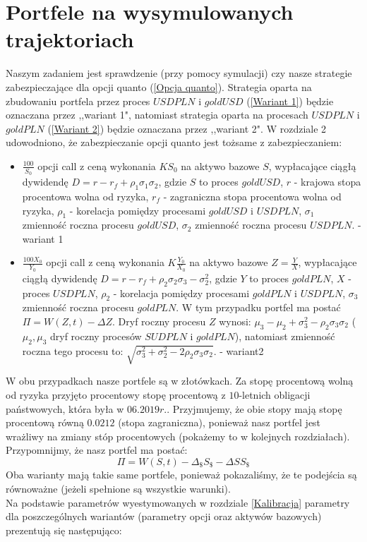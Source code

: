 \documentclass[12pt]{article}
\begin{document}
\newpage

\section{Portfele na wysymulowanych trajektoriach}
Naszym zadaniem jest sprawdzenie (przy pomocy symulacji) czy nasze strategie zabezpieczające dla
opcji quanto (\ref{Opcja quanto}). Strategia oparta na zbudowaniu portfela przez proces $USDPLN$ i $goldUSD$ (\ref{Wariant 1}) będzie oznaczana przez ,,wariant 1", natomiast strategia oparta na procesach $USDPLN$ i $goldPLN$ (\ref{Wariant 2}) będzie oznaczana przez ,,wariant 2". W rozdziale 2 udowodniono, że zabezpieczanie opcji quanto jest tożsame z zabezpieczaniem:
\begin{itemize}
    \item $\frac{100}{S_0}$ opcji call z ceną wykonania $KS_0$ na aktywo bazowe $S$, wypłacające ciągłą dywidendę $D=r-r_f+\rho_1 \sigma_1 \sigma_2$, gdzie $S$ to proces $goldUSD$, $r$ - krajowa stopa procentowa wolna od ryzyka, $r_f$ - zagraniczna stopa procentowa wolna od ryzyka, $\rho_1$ - korelacja pomiędzy procesami $goldUSD$ i $USDPLN$, $\sigma_1$ zmienność roczna procesu $goldUSD$, $\sigma_2$ zmienność roczna procesu $USDPLN$. - wariant 1
    \item $\frac{100 X_0}{Y_0}$ opcji call z ceną wykonania $K\frac{Y_0}{X_0}$ na aktywo bazowe $Z = \frac{Y}{X}$, wypłacające ciągłą dywidendę $D=r-r_f+\rho_2 \sigma_2 \sigma_3 - \sigma_2^2$, gdzie $Y$ to proces $goldPLN$, $X$ - proces $USDPLN$, $\rho_2$ - korelacja pomiędzy procesami $goldPLN$ i $USDPLN$, $\sigma_3$ zmienność roczna procesu $goldPLN$.
    W tym przypadku portfel ma postać $\Pi = W(Z,t) - \Delta Z$. Dryf roczny procesu $Z$ wynosi: $\mu_3 - \mu_2 + \sigma_3^2 - \rho_2 \sigma_3 \sigma_2$ ($\mu_2, \mu_3$ dryf roczny procesów $SUDPLN$ i $goldPLN$), natomiast zmienność roczna tego procesu to: $\sqrt{\sigma_3^2 + \sigma_2^2 - 2\rho_2 \sigma_3 \sigma_2}$. - wariant2
\end{itemize}
W obu przypadkach nasze portfele są w złotówkach.
\newline
Za stopę procentową wolną od ryzyka przyjęto procentowy stopę procentową z $10$-letnich obligacji państwowych, która była w $06.2019r.$. Przyjmujemy, że obie stopy mają stopę procentową równą $0.0212$ (stopa zagraniczna), ponieważ nasz portfel jest wrażliwy na zmiany stóp procentowych (pokażemy to w kolejnych rozdziałach). Przypomnijmy, że nasz portfel ma postać: 
$$\Pi = W(S,t) - \Delta_\$ S_\$ - \Delta S S_\$$$
Oba warianty mają takie same portfele, ponieważ pokazaliśmy, że te podejścia są równoważne (jeżeli spełnione są wszystkie warunki).
\\
Na podstawie parametrów wyestymowanych w rozdziale \ref{Kalibracja} parametry dla poszczególnych wariantów (parametry opcji oraz aktywów bazowych) prezentują się następująco:
\end{document}
